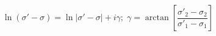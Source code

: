 \begin{equation}
\label{log}
\ln (\sigma' -\sigma )=\ln |\sigma'-\sigma |+i\gamma;\;\gamma =\arctan [\frac{\sigma'_2-\sigma_2}{\sigma'_1-\sigma_1}]
\end{equation}

